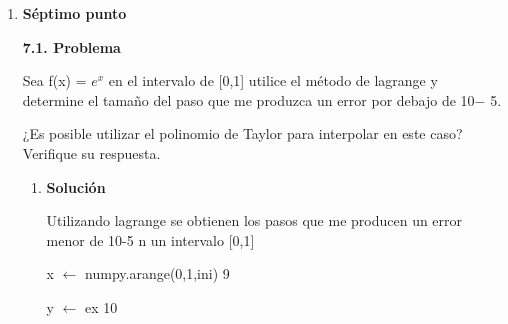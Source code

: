 \documentclass[12pt]{article}
\renewcommand{\_}{\kern-1.5pt\textunderscore\kern-1.5pt}
\begin{document}
\begin{enumerate}[label*={\fontsize{14pt}{14pt}\selectfont \textbf{\arabic*.}}]
\begin{adjustwidth}{0.21in}{0.0in}
La función luce así:\par

\end{adjustwidth}




\begin{figure}[H]
	\begin{Center}
		\texttt{[image: ./media/image5.png]}
	\end{Center}
\end{figure}



\par


\vspace{\baselineskip}
	\item {\fontsize{14pt}{16.8pt}\selectfont \textbf{Séptimo punto}\par}\par

\textbf{7.1. Problema}\par

Sea f(x) =  \( e^{x} \)  en el intervalo de [0,1] utilice el método de lagrange y determine el tamaño del paso que me produzca un error por debajo de 10$-$ 5. \par


\vspace{\baselineskip}
¿Es posible utilizar el polinomio de Taylor para interpolar en este caso? Veriﬁque su respuesta.\par


\vspace{\baselineskip}
\begin{enumerate}[label*={\fontsize{12pt}{12pt}\selectfont \textbf{\arabic*.}}]
	\item \textbf{Solución}\par

Utilizando lagrange se obtienen los pasos que me producen un error menor de 10-5 n un intervalo [0,1]\par


\vspace{\baselineskip}
x $ \leftarrow $  numpy.arange(0,1,ini) 9\par

y $ \leftarrow $  ex 10 \par


\end{enumerate}
\end{enumerate}
\end{document}
